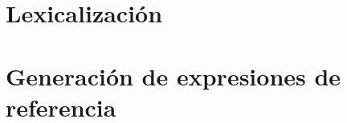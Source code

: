 


\section{Lexicalización}
\label{sec:microplannin_lexicalization}

\section{Generación de expresiones de referencia}